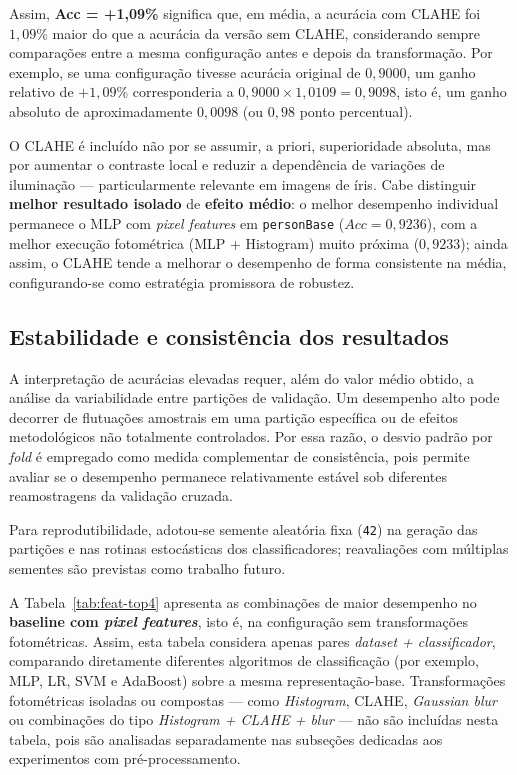 \documentclass[11pt,a4paper]{article}
\begin{document}
Assim, \textbf{Acc = +1{,}09\%} significa que, em média, a acurácia com CLAHE foi \(1{,}09\%\) maior do que a acurácia da versão sem CLAHE, considerando sempre comparações entre a mesma configuração antes e depois da transformação. Por exemplo, se uma configuração tivesse acurácia original de \(0{,}9000\), um ganho relativo de \(+1{,}09\%\) corresponderia a \(0{,}9000 \times 1{,}0109 = 0{,}9098\), isto é, um ganho absoluto de aproximadamente \(0{,}0098\) (ou \(0{,}98\) ponto percentual).

O CLAHE é incluído não por se assumir, a priori, superioridade absoluta, mas por aumentar o contraste local e reduzir a dependência de variações de iluminação --- particularmente relevante em imagens de íris. Cabe distinguir \textbf{melhor resultado isolado} de \textbf{efeito médio}: o melhor desempenho individual permanece o MLP com \textit{pixel features} em \texttt{personBase} (\(Acc = 0{,}9236\)), com a melhor execução fotométrica (MLP + Histogram) muito próxima (\(0{,}9233\)); ainda assim, o CLAHE tende a melhorar o desempenho de forma consistente na média, configurando-se como estratégia promissora de robustez.


\subsection{Estabilidade e consistência dos resultados}

A interpretação de acurácias elevadas requer, além do valor médio obtido, a análise da variabilidade entre partições de validação. Um desempenho alto pode decorrer de flutuações amostrais em uma partição específica ou de efeitos metodológicos não totalmente controlados. Por essa razão, o desvio padrão por \textit{fold} é empregado como medida complementar de consistência, pois permite avaliar se o desempenho permanece relativamente estável sob diferentes reamostragens da validação cruzada.

Para reprodutibilidade, adotou-se semente aleatória fixa (\texttt{42}) na geração das partições e nas rotinas estocásticas dos classificadores; reavaliações com múltiplas sementes são previstas como trabalho futuro.

A Tabela~\ref{tab:feat-top4} apresenta as combinações de maior desempenho no \textbf{baseline com \emph{pixel features}}, isto é, na configuração sem transformações fotométricas. Assim, esta tabela considera apenas pares \textit{dataset + classificador}, comparando diretamente diferentes algoritmos de classificação (por exemplo, MLP, LR, SVM e AdaBoost) sobre a mesma representação-base. Transformações fotométricas isoladas ou compostas --- como \textit{Histogram}, CLAHE, \textit{Gaussian blur} ou combinações do tipo \textit{Histogram + CLAHE + blur} --- não são incluídas nesta tabela, pois são analisadas separadamente nas subseções dedicadas aos experimentos com pré-processamento.
\end{document}
